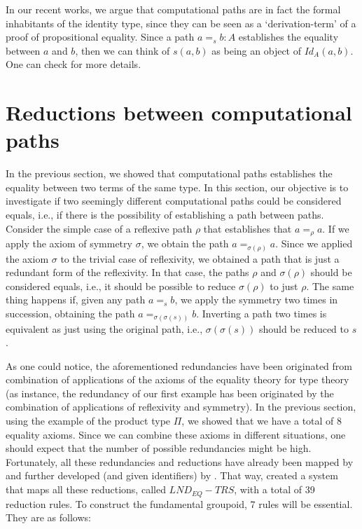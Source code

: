 \documentclass[12pt, a4paper,  oneside, headinclude,footinclude, BCOR5mm]{scrartcl}
\begin{document}
In our recent works, we argue that computational paths are in fact the formal inhabitants of the identity type, since they can be seen as a `derivation-term' of a proof of propositional equality. Since a path $a =_{s} b : A$ establishes the equality between $a$ and $b$, then we can think of $s(a,b)$ as being an object of $Id_{A}(a,b)$. One can check \cite{Ruy1, Art1en,Ruy5} for more details.

\section{Reductions between computational paths}

In the previous section, we showed that computational paths establishes the equality between two terms of the same type. In this section, our objective is to investigate if two seemingly different computational paths could be considered equals, i.e., if there is the possibility of establishing a path between paths. Consider the simple case of a reflexive path $\rho$ that establishes that $a =_{\rho} a$. If we apply the axiom of symmetry $\sigma$, we obtain the path $a =_{\sigma(\rho)} a$. Since we applied the axiom $\sigma$ to the trivial case of reflexivity, we obtained a path that is just a redundant form of the reflexivity. In that case, the paths $\rho$ and $\sigma(\rho)$ should be considered equals, i.e., it should be possible to reduce $\sigma(\rho)$ to just $\rho$. The same thing happens if, given any path $a =_{s} b$, we apply the symmetry two times in succession, obtaining the path $a =_{\sigma(\sigma(s))} b$. Inverting a path two times is equivalent as just using the original path, i.e., $\sigma(\sigma(s))$ should be reduced to $s$.

As one could notice, the aforementioned redundancies have been originated from combination of applications of the axioms of the equality theory for type theory (as instance, the redundancy of our first example has been originated by the combination of applications of reflexivity and symmetry). In the previous section, using the example of the product type $\Pi$, we showed that we have a total of 8 equality axioms. Since we can combine these axioms in different situations, one should expect that the number of possible redundancies might be high. Fortunately, all these redundancies and reductions have already been mapped by \cite{Anjo1} and further developed (and given identifiers) by \cite{Ruy1}. That way, \cite{Anjo1} created a system that maps all these reductions, called $LND_{EQ}-TRS$, with a total of 39 reduction rules. To construct the fundamental groupoid, 7 rules will be essential. They are as follows:
\end{document}
